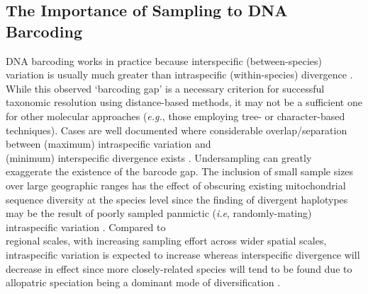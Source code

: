 \subsection{The Importance of Sampling to DNA Barcoding}

DNA barcoding works in practice because interspecific (between-species) variation is usually much greater than intraspecific (within-species) divergence \cite{meyer2005dna, stoeckle2014dna}. While this observed `barcoding gap' \cite{meyer2005dna} is a necessary criterion for successful taxonomic resolution using distance-based methods, it may not be a sufficient one for other molecular approaches (\textit{e.g.}, those employing tree- or character-based techniques). Cases are well documented where considerable overlap/separation between (maximum) intraspecific variation and  \\ (minimum) interspecific divergence exists \cite{hebert2004identification, hubert2015dna}. Undersampling can greatly \\ exaggerate the existence of the barcode gap. The inclusion of small sample sizes over large geographic ranges has the effect of obscuring existing mitochondrial sequence diversity at the species level since the finding of divergent haplotypes may be the result of poorly sampled panmictic (\textit{i.e}, randomly-mating) intraspecific variation \cite{clare2011neotropical}. Compared to \\ regional scales, with increasing sampling effort across wider spatial scales, intraspecific variation is expected to increase whereas interspecific divergence will decrease in effect since more closely-related species will tend to be found due to allopatric speciation being a dominant mode of diversification \cite{bergsten2012effect, pentinsaari2014barcoding}. 



